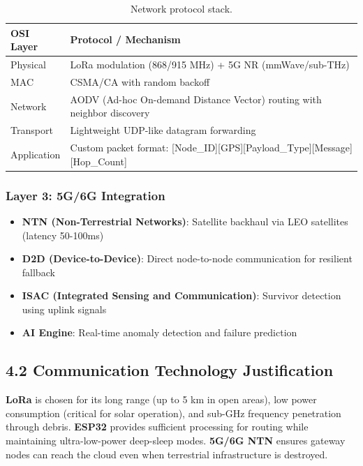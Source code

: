 \documentclass[12pt,a4paper]{article}
\begin{document}
\begin{table}[H]
\centering
\begin{tabular}{@{}l l@{}}
\toprule
\textbf{OSI Layer} & \textbf{Protocol / Mechanism} \\
\midrule
Physical & LoRa modulation (868/915 MHz) + 5G NR (mmWave/sub-THz) \\
MAC & CSMA/CA with random backoff \\
Network & AODV (Ad-hoc On-demand Distance Vector) routing with neighbor discovery \\
Transport & Lightweight UDP-like datagram forwarding \\
Application & Custom packet format: [Node\_ID][GPS][Payload\_Type][Message][Hop\_Count] \\
\bottomrule
\end{tabular}
\caption{Network protocol stack.}
\label{tab:protocol}
\end{table}

\subsubsection*{Layer 3: 5G/6G Integration}

\begin{itemize}
    \item \textbf{NTN (Non-Terrestrial Networks)}: Satellite backhaul via LEO satellites (latency 50-100ms)
    \item \textbf{D2D (Device-to-Device)}: Direct node-to-node communication for resilient fallback
    \item \textbf{ISAC (Integrated Sensing and Communication)}: Survivor detection using uplink signals
    \item \textbf{AI Engine}: Real-time anomaly detection and failure prediction
\end{itemize}

\subsection*{4.2 Communication Technology Justification}

\textbf{LoRa} is chosen for its long range (up to 5 km in open areas), low power consumption (critical for solar operation), and sub-GHz frequency penetration through debris. \textbf{ESP32} provides sufficient processing for routing while maintaining ultra-low-power deep-sleep modes. \textbf{5G/6G NTN} ensures gateway nodes can reach the cloud even when terrestrial infrastructure is destroyed.
\end{document}
